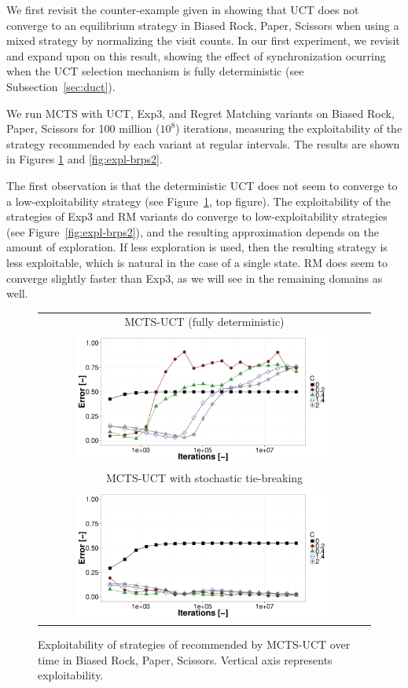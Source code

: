 We first revisit the counter-example given in \cite{Shafiei09} showing that
UCT does not converge to an equilibrium strategy in Biased Rock, Paper, Scissors
when using a mixed strategy by normalizing the visit counts.
In our first experiment, we revisit and expand upon on this result, showing the effect of synchronization ocurring when the UCT selection mechanism is fully deterministic (see Subsection~\ref{sec:duct}).

We run MCTS with UCT, Exp3, and Regret Matching variants on Biased Rock, Paper, Scissors
for 100 million ($10^8$) iterations, measuring the exploitability of the strategy recommended by
each variant at regular intervals. The results are shown in Figures \ref{fig:expl-brps1} and \ref{fig:expl-brps2}.

The first observation is that the deterministic UCT does not seem to converge to a low-exploitability strategy (see Figure~\ref{fig:expl-brps1}, top figure). The exploitability of the strategies of
Exp3 and RM variants do converge to low-exploitability strategies (see Figure~\ref{fig:expl-brps2}), and the resulting approximation depends on the amount of exploration.
If less exploration is used, then the resulting strategy is less exploitable, which is natural in the case of a single state. RM does seem to
converge slightly faster than Exp3, as we will see in the remaining domains as well.

\begin{figure}[t!]
\centering
\begin{tabular}{c}
{\small MCTS-UCT (fully deterministic)} \\
\includegraphics[width=0.8\textwidth]{figures/brps-MCTS-UCT.pdf} \\
{\small MCTS-UCT with stochastic tie-breaking} \\
\includegraphics[width=0.8\textwidth]{figures/brps-MCTS-UCT-NONDET.pdf} \\
\end{tabular}
\caption{Exploitability of strategies of recommended by MCTS-UCT over time in Biased Rock, Paper, Scissors. Vertical axis represents exploitability. }
\label{fig:expl-brps1}
\end{figure}

